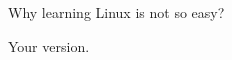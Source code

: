 \begin{frame}{Why learning Linux is not so easy?}
	\begin{center}
		\large Your version.
	\end{center} 
\end{frame}
